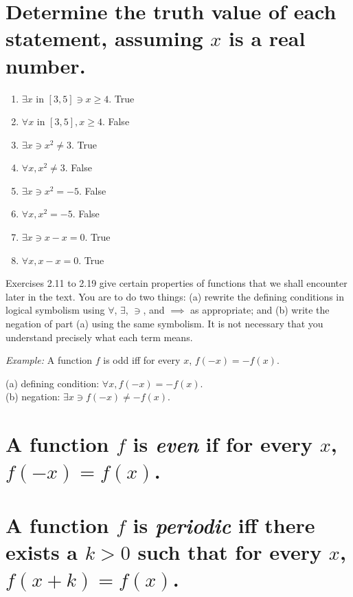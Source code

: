 \documentclass[11pt]{article} %
\begin{document}
\section{Determine the truth value of each statement, assuming $x$ is a real number.}
\begin{enumerate}
\item $\exists x$ in $\left[ 3,5 \right]\ni x\geq4$.
\subitem True
\item $\forall x$ in $\left[ 3,5 \right], x\geq4$.
\subitem False
\item $\exists x \ni x^2 \neq 3$.
\subitem True
\item $\forall x, x^2 \neq 3$.
\subitem False
\item $\exists x \ni x^2 = -5$.
\subitem False
\item $\forall x, x^2 = -5$.
\subitem False
\item $\exists x \ni x-x=0$.
\subitem True
\item $\forall x, x-x=0$.
\subitem True
\end{enumerate}
\noindent
Exercises 2.11 to 2.19 give certain properties of functions that we shall encounter later in the text. You are to do two things: (a) rewrite the defining conditions in logical symbolism using $\forall$, $\exists$, $\ni$, and $\implies$ as appropriate; and (b) write the negation of part (a) using the same symbolism. It is not necessary that you understand precisely what each term means.
\begin{center}
\textit{Example:} A function $f$ is odd iff for every $x$, $f(-x)=-f(x)$.
\end{center}
\hspace*{4cm}(a) defining condition: $\forall x, f(-x)=-f(x)$.\\
\hspace*{4cm}(b) negation: $\exists x \ni f(-x)\neq-f(x)$.

\section{A function $f$ is \textit{even} if for every $x$, $f(-x)=f(x)$.}

\section{A function $f$ is \textit{periodic} iff there exists a $k>0$ such that for every $x$, $f(x+k)=f(x)$.}
\end{document}
